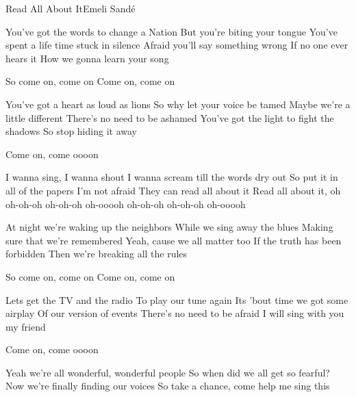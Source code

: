 \begin{Song}{Read All About It}{Emeli Sandé}
\begin{multicols}{2}

\begin{Verse}
You've got the words to change a Nation
But you're biting your tongue
You've spent a life time stuck in silence
Afraid you'll say something wrong
If no one ever hears it
How we gonna learn your song
\espaceInterStrophe

So come on, come on
Come on, come on
\end{Verse}
\espaceInterStrophe

\begin{Verse}
You've got a heart as loud as lions
So why let your voice be tamed
Maybe we're a little different
There's no need to be ashamed
You've got the light to fight the shadows
So stop hiding it away
\espaceInterStrophe

Come on, come oooon
\end{Verse}
\espaceInterStrophe

\begin{Chorus}
I wanna sing, I wanna shout
I wanna scream till the words dry out
So put it in all of the papers
I'm not afraid
They can read all about it
Read all about it, oh
oh-oh-oh
oh-oh-oh
oh-ooooh
oh-oh-oh
oh-oh-oh
oh-ooooh
\end{Chorus}
\vfill
\columnbreak

\begin{Verse}
At night we're waking up the neighbors
While we sing away the blues
Making sure that we're remembered
Yeah, cause we all matter too
If the truth has been forbidden
Then we're breaking all the rules
\espaceInterStrophe

So come on, come on
Come on, come on
\end{Verse}
\espaceInterStrophe

\begin{Verse}
Lets get the TV and the radio
To play our tune again
Its 'bout time we got some airplay
Of our version of events
There's no need to be afraid
I will sing with you my friend
\espaceInterStrophe

Come on, come oooon
\end{Verse}
\espaceInterStrophe

\tochorus
\espaceInterStrophe

\begin{Bridge}
Yeah we're all wonderful, wonderful people
So when did we all get so fearful?
Now we're finally finding our voices
So take a chance, come help me sing this
\espaceInterStrophe


\end{Bridge}
\end{multicols}
\end{Song}
